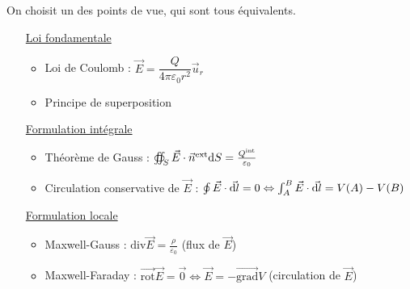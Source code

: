        On choisit un des points de vue, qui sont tous équivalents.
        \begin{enumerate}[align=left]
            \item [\underline{Loi fondamentale}]\phantom{}
            \begin{itemize}
                \item Loi de Coulomb : $\vec{E}=\dfrac{Q}{4\pi\varepsilon_0 r^{2}}\vec{u}_r$
                \item Principe de superposition
            \end{itemize}
            \item [\underline{Formulation intégrale}]\phantom{}
            \begin{itemize}
                \item Théorème de Gauss : $\oiint_{S}\vec{E}\cdot\vec{n}^{\text{ext}}\mathrm{d} S=\frac{Q^{\text{int}}}{\varepsilon_0}$
                \item Circulation conservative de $\vec{E}$ : $\oint\vec{E}\cdot\vec{\mathrm{d} l}=0\Leftrightarrow\int_{A}^{B}\vec{E}\cdot\vec{\mathrm{d} l}=V(A)-V(B)$
            \end{itemize}
            \item [\underline{Formulation locale}]\phantom{}
            \begin{itemize}
                \item Maxwell-Gauss : $\mathrm{div}\vec{E}=\frac{\rho}{\varepsilon_0}$ (flux de $\vec{E}$)
                \item Maxwell-Faraday : $\vec{\mathrm{rot}}\vec{E}=\vec{0}\Leftrightarrow\vec{E}=-\vec{\mathrm{grad}}V$ (circulation de $\vec{E}$)
            \end{itemize}
        \end{enumerate}
        